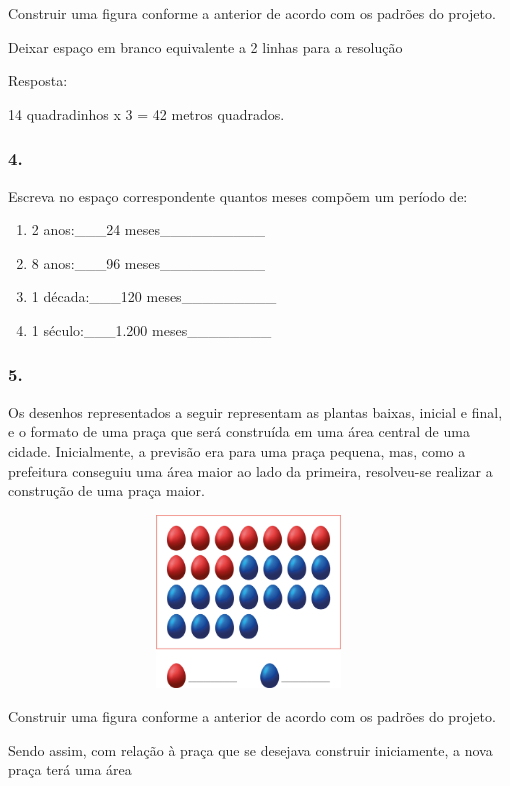 \begin{enumerate}
\begin{escolha}
\begin{enumerate}
\begin{itemize}
\begin{itemize}
\begin{escolha}
Construir uma figura conforme a anterior de acordo com os padrões do
projeto.

Deixar espaço em branco equivalente a 2 linhas para a resolução

Resposta:

14 quadradinhos x 3 = 42 metros quadrados.

\subsubsection{4.}\label{section-55}

Escreva no espaço correspondente quantos meses compõem um período de:

\begin{enumerate}
\def\labelenumi{\alph{enumi})}
\item
  2 anos:­­­­­­­­­­­­­­­­­­­\_\_\_24 meses\_\_\_\_\_\_\_\_\_\_
\item
  8 anos:\_\_\_96 meses\_\_\_\_\_\_\_\_\_\_
\item
  1 década:\_\_\_120 meses\_\_\_\_\_\_\_\_\_
\item
  1 século:\_\_\_1.200 meses\_\_\_\_\_\_\_\_
\end{enumerate}

\subsubsection{5.}\label{section-56}

Os desenhos representados a seguir representam as plantas baixas, inicial
e final, e o formato de uma praça que será construída em uma área
central de uma cidade. Inicialmente, a previsão era para uma praça
pequena, mas, como a prefeitura conseguiu uma área maior ao lado da
primeira, resolveu-se realizar a construção de uma praça maior.

\includegraphics[width=5.00877in,height=1.80849in]{media/image64.png}

Construir uma figura conforme a anterior de acordo com os padrões do
projeto.

Sendo assim, com relação à praça que se desejava construir iniciamente,
a nova praça terá uma área


\end{escolha}
\end{itemize}
\end{itemize}
\end{enumerate}
\end{escolha}
\end{enumerate}
